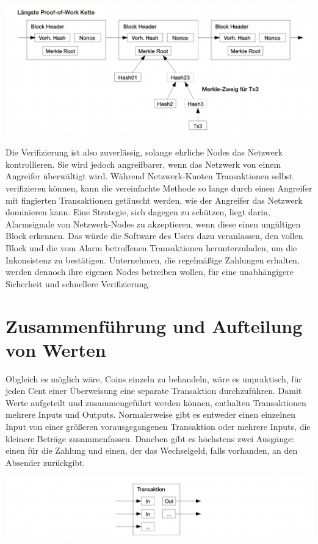\documentclass[9pt]{article}
\begin{document}
	\begin{center}
		\includegraphics[width=\textwidth]{pics/spv.png}
	\end{center}
	
    Die Verifizierung ist also zuverlässig, solange ehrliche Nodes das Netzwerk kontrollieren. Sie wird jedoch angreifbarer, wenn das Netzwerk von einem Angreifer überwältigt wird. Während Netzwerk-Knoten Transaktionen selbst verifizieren können, kann die vereinfachte Methode so lange durch einen Angreifer mit fingierten Transaktionen getäuscht werden, wie der Angreifer das Netzwerk dominieren kann. Eine Strategie, sich dagegen zu schützen, liegt darin, Alarmsignale von Netzwerk-Nodes zu akzeptieren, wenn diese einen ungültigen Block erkennen. Das würde die Software des Users dazu veranlassen, den vollen Block und die vom Alarm betroffenen Transaktionen herunterzuladen, um die Inkonsistenz zu bestätigen. Unternehmen, die regelmäßige Zahlungen erhalten, werden dennoch ihre eigenen Nodes betreiben wollen, für eine unabhängigere Sicherheit und schnellere Verifizierung.

	\section{Zusammenführung und Aufteilung von Werten}
	
    Obgleich es möglich wäre, Coins einzeln zu behandeln, wäre es unpraktisch, für jeden Cent einer Überweisung eine separate Transaktion durchzuführen. Damit Werte aufgeteilt und zusammengeführt werden können, enthalten Transaktionen mehrere Inputs und Outputs. Normalerweise gibt es entweder einen einzelnen Input von einer größeren vorausgegangenen Transaktion oder mehrere Inputs, die kleinere Beträge zusammenfassen. Daneben gibt es höchstens zwei Ausgänge: einen für die Zahlung und einen, der das Wechselgeld, falls vorhanden, an den Absender zurückgibt.
	
	\begin{center}
		\includegraphics[width=\textwidth]{pics/combineandsplit.png}
	\end{center}
	
\end{document}
